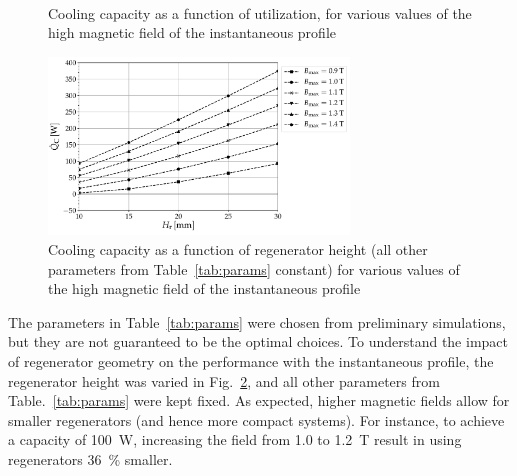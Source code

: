 \documentclass[draft]{svjour3}
\begin{document}
\begin{figure}[!ht]
  \centering
{}
\,
  \caption{Cooling capacity as a function of utilization, for various values of the high magnetic field  of the instantaneous profile}
  \label{fig:qc_phi_inst}
\end{figure}

\begin{figure}[!ht]
  \centering
  \includegraphics[width=8cm]{Qc_H_inst_f_1_Phi_40}
  \caption{Cooling capacity as a function of  regenerator height (all other parameters from Table~\ref{tab:params} constant) for various values of the high magnetic field of the instantaneous profile}
\label{fig:Qc_H_inst}
\end{figure}

The parameters in Table~\ref{tab:params} were chosen from preliminary simulations, but they are not guaranteed to be the optimal choices. To understand the impact of regenerator geometry on the performance with the instantaneous profile, the regenerator height was varied in Fig.~\ref{fig:Qc_H_inst}, and all other parameters from Table.~\ref{tab:params} were kept fixed. As expected, higher magnetic fields allow for smaller regenerators (and hence more compact systems). For instance, to achieve a capacity of \SI{100}{\watt}, increasing the field from \num{1.0} to \SI{1.2}{\tesla} result in using regenerators \SI{36}{\percent} smaller.
\end{document}
